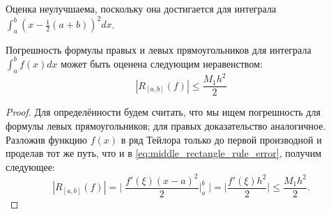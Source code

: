 \documentclass[../main.tex]{subfile}
\begin{document}
Оценка неулучшаема, поскольку она достигается для интеграла\\
$\int_a^b(x-\frac{1}{2}(a+b))^2dx$.

\begin{theorem}
\label{eq:rl_rectangle_rule_error}
	Погрешность формулы правых и левых прямоугольников для интеграла
	$\int_a^b f(x)dx$ может быть оценена следующим неравенством:
	\[\boxed{|R_{[a,b]}(f)|\le\frac{M_1h^2}{2}}\]
\end{theorem}

\begin{proof}
	Для определённости будем считать, что мы ищем погрешность для формулы
	левых прямоугольников; для правых доказательство аналогичное. Разложив
	функцию $f(x)$ в ряд Тейлора только до первой производной и проделав
	тот же путь, что и в \eqref{eq:middle_rectangle_rule_error}, получим
	следующее:
	\[|R_{[a,b]}(f)|=\Big|\;\frac{f'(\xi)(x-a)^2}{2}\Big|_a^b\;\Big|=
	\Big|\frac{f'(\xi)h^2}{2}\Big|\le\frac{M_1h^2}{2}.\]
\end{proof}
\end{document}
